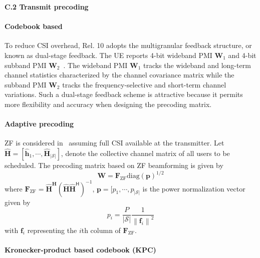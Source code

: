 \documentclass[a4paper,12pt]{article}%
\newcommand{\norm}[1]{\left\lVert#1\right\rVert} %
\begin{document}
\noindent \textbf{C.2 Transmit precoding}


\paragraph{Codebook based}

To reduce CSI overhead, Rel. 10 adopts the multigranular feedback structure, or known as dual-stage feedback. The UE reports 4-bit wideband PMI $\mathbf{W}_1$ and 4-bit subband PMI $\mathbf{W}_2$~\cite{R1-105011}. The wideband PMI $\mathbf{W}_1$ tracks the wideband and long-term channel statistics characterized by the channel covariance matrix while the subband PMI
$\mathbf{W}_2$ tracks the frequency-selective and short-term channel
variations. Such a dual-stage feedback scheme is attractive because
it permits more flexibility and accuracy when designing the
precoding matrix.


\paragraph{Adaptive precoding}

ZF is considered in~\cite{Yoo2007} assuming full CSI available at the transmitter. Let $\hat{\mathbf{H}}=[\hat{\mathbf{h}}_1,\cdots, \hat{\mathbf{H}}_{|\mathcal{S}|}]$, denote the collective channel matrix of all users to be scheduled. The precoding matrix based on ZF beamforming is given by
\begin{equation}
\mathbf{W}=\mathbf{F}_{\text{ZF}}\text{diag} (\mathbf{p})^{1/2}
\end{equation}
where $\mathbf{F}_{\text{ZF}}=\hat{\mathbf{H}}^\mathbf{H} (\hat{\mathbf{H}} \hat{\mathbf{H}}^\mathsf{H} )^{-1}$, $\mathbf{p}=[p_{1},\cdots, p_{|\mathcal{S}|}$ is the power normalization vector given by
\begin{equation}
p_i = \frac{P}{|\mathcal{S}|} \frac{1}{ \norm{ \mathbf{f}_i}^2 }
\end{equation}
with $\mathbf{f}_i$ representing the $i$th column of $\mathbf{F}_{\text{ZF}}$.

\paragraph{Kronecker-product based codebook (KPC)}
\end{document}
